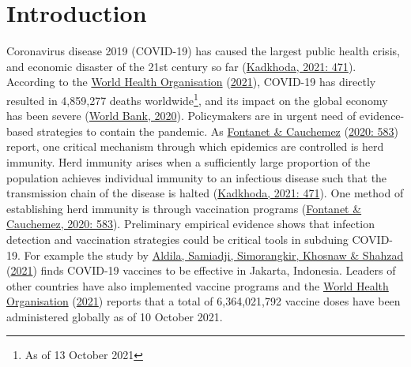\documentclass[11pt,preprint, authoryear]{elsarticle}
\numberwithin{equation}{section}
\numberwithin{figure}{section}
\numberwithin{table}{section}
\let\rmarkdownfootnote\footnote%
\def\footnote{\protect\rmarkdownfootnote}
\begin{document}
\renewcommand{\contentsname}{Table of Contents}
{\tableofcontents}

\pagestyle{fancy}
\chead{}
\rhead{}
\lfoot{}
\lhead{}
\cfoot{}


\headsep 35pt %




\newpage

\hypertarget{introduction}{%
\section{\texorpdfstring{Introduction
\label{Introduction}}{Introduction }}\label{introduction}}

Coronavirus disease 2019 (COVID-19) has caused the largest public health
crisis, and economic disaster of the 21st century so far
(\protect\hyperlink{ref-bad}{Kadkhoda, 2021: 471}). According to the
\protect\hyperlink{ref-who}{World Health Organisation}
(\protect\hyperlink{ref-who}{2021}), COVID-19 has directly resulted in
4,859,277 deaths worldwide\footnote{As of 13 October 2021}, and its
impact on the global economy has been severe
(\protect\hyperlink{ref-bank}{World Bank, 2020}). Policymakers are in
urgent need of evidence-based strategies to contain the pandemic. As
\protect\hyperlink{ref-immun}{Fontanet \& Cauchemez}
(\protect\hyperlink{ref-immun}{2020: 583}) report, one critical
mechanism through which epidemics are controlled is herd immunity. Herd
immunity arises when a sufficiently large proportion of the population
achieves individual immunity to an infectious disease such that the
transmission chain of the disease is halted
(\protect\hyperlink{ref-bad}{Kadkhoda, 2021: 471}). One method of
establishing herd immunity is through vaccination programs
(\protect\hyperlink{ref-immun}{Fontanet \& Cauchemez, 2020: 583}).
Preliminary empirical evidence shows that infection detection and
vaccination strategies could be critical tools in subduing COVID-19. For
example the study by \protect\hyperlink{ref-erad}{Aldila, Samiadji,
Simorangkir, Khosnaw \& Shahzad} (\protect\hyperlink{ref-erad}{2021})
finds COVID-19 vaccines to be effective in Jakarta, Indonesia. Leaders
of other countries have also implemented vaccine programs and the
\protect\hyperlink{ref-who}{World Health Organisation}
(\protect\hyperlink{ref-who}{2021}) reports that a total of
6,364,021,792 vaccine doses have been administered globally as of 10
October 2021.
\end{document}
